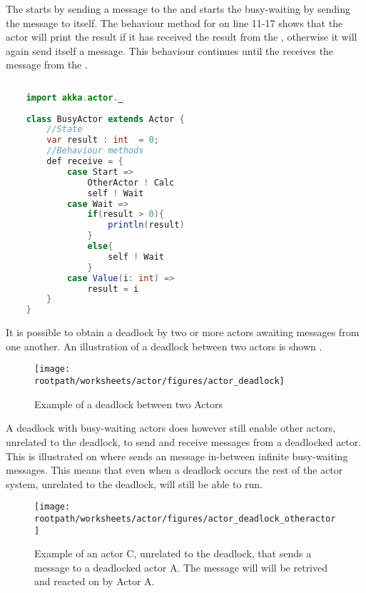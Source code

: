 The  starts by sending a message to the  and starts the busy-waiting by sending the  message to itself. The behaviour method for  on line 11-17 shows that the actor will print the result if it has received the result from the , otherwise it will again send itself a  message. This behaviour continues until the  receives the  message from the . 

\begin{lstlisting}[label=lst:actor_busywait,
  caption={Busy-waiting actor program written in the Scala Akka actor framework.},
  language=Java,  
  showspaces=false,
  showtabs=false,
  breaklines=true,
  showstringspaces=false,
  breakatwhitespace=true,
  commentstyle=\color{greencomments},
  keywordstyle=\color{bluekeywords},
  stringstyle=\color{redstrings}]  % Start your code-block
	
	import akka.actor._
	
	class BusyActor extends Actor {
		//State
		var result : int  = 0;
		//Behaviour methods
		def receive = {
			case Start =>
				OtherActor ! Calc
				self ! Wait
			case Wait =>
				if(result > 0){
					println(result)
				}
				else{
					self ! Wait
				}	
			case Value(i: int) =>
				result = i
		}
	}
\end{lstlisting}
It is possible to obtain a deadlock by two or more actors awaiting messages from one another. An illustration of a deadlock between two actors is shown .

\begin{figure}[ht!]
\centering
\texttt{[image: \\rootpath/worksheets/actor/figures/actor\_deadlock]}
\caption{Example of a deadlock between two Actors}\label{fig:actor_deadlock}
\end{figure}

A deadlock with busy-waiting actors does however still enable other actors, unrelated to the deadlock, to send and receive messages from a deadlocked actor. This is illustrated on  where  sends an  message in-between  infinite busy-waiting messages. This means that even when a deadlock occurs the rest of the actor system, unrelated to the deadlock, will still be able to run.

\begin{figure}[ht!]
\centering
\texttt{[image: \\rootpath/worksheets/actor/figures/actor\_deadlock\_otheractor]}
\caption{Example of an actor C, unrelated to the deadlock, that sends a message to a deadlocked actor A. The message will will be retrived and reacted on by Actor A.}\label{fig:actor_deadlock_otheractor}
\end{figure}

